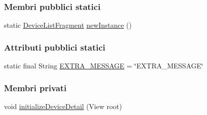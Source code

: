 \subsubsection*{Membri pubblici statici}
\begin{DoxyCompactItemize}
\item 
static \hyperlink{classit_1_1unibo_1_1torsello_1_1bluetoothpositioning_1_1fragment_1_1devicesObservers_1_1DeviceListFragment}{Device\+List\+Fragment} \hyperlink{classit_1_1unibo_1_1torsello_1_1bluetoothpositioning_1_1fragment_1_1devicesObservers_1_1DeviceListFragment_aae7377d92372118bec0bd8a6aa2c61c0_aae7377d92372118bec0bd8a6aa2c61c0}{new\+Instance} ()
\end{DoxyCompactItemize}
\subsubsection*{Attributi pubblici statici}
\begin{DoxyCompactItemize}
\item 
static final String \hyperlink{classit_1_1unibo_1_1torsello_1_1bluetoothpositioning_1_1fragment_1_1devicesObservers_1_1DeviceListFragment_a6ba928c98442b32c8a32eb35b7cecf45_a6ba928c98442b32c8a32eb35b7cecf45}{E\+X\+T\+R\+A\+\_\+\+M\+E\+S\+S\+A\+GE} = \char`\"{}E\+X\+T\+R\+A\+\_\+\+M\+E\+S\+S\+A\+GE\char`\"{}
\end{DoxyCompactItemize}
\subsubsection*{Membri privati}
\begin{DoxyCompactItemize}
\item 
void \hyperlink{classit_1_1unibo_1_1torsello_1_1bluetoothpositioning_1_1fragment_1_1devicesObservers_1_1DeviceListFragment_a34eb53805cb490013ab68ee251bdf473_a34eb53805cb490013ab68ee251bdf473}{initialize\+Device\+Detail} (View root)
\end{DoxyCompactItemize}
